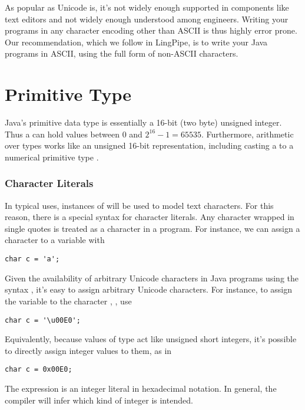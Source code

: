 As popular as Unicode is, it's not widely enough supported in
components like text editors and not widely enough understood among
engineers.  Writing your programs in any character encoding other than
ASCII is thus highly error prone.  Our recommendation, which we follow
in LingPipe, is to write your Java programs in ASCII, using the full
 form of non-ASCII characters.


\section{ Primitive Type}

Java's primitive  data type is essentially a 16-bit (two
byte) unsigned integer. Thus a  can hold values between 0
and $2^16-1 = 65535$.  Furthermore, arithmetic over  types
works like an unsigned 16-bit representation, including casting a
 to a numerical primitive type .

\subsubsection{Character Literals}\label{section:character-literals}

In typical uses, instances of  will be used to model text
characters.  For this reason, there is a special syntax for character
literals.  Any character wrapped in single quotes is treated as
a character in a program.  For instance, we can assign a character
to a variable with 
%
\begin{verbatim}
char c = 'a'; 
\end{verbatim}
%
Given the availability of arbitrary Unicode characters in Java
programs using the syntax , it's easy
to assign arbitrary Unicode characters.  For instance, 
to assign the variable  to the character ,
, use
%
\begin{verbatim}
char c = '\u00E0'; 
\end{verbatim}
%
Equivalently, because values of type  act like unsigned
short integers, it's possible to directly assign integer values
to them, as in
%
\begin{verbatim}
char c = 0x00E0;
\end{verbatim}
%
The expression  is an integer literal in hexadecimal
notation.  In general, the compiler will infer which kind of integer
is intended.  

